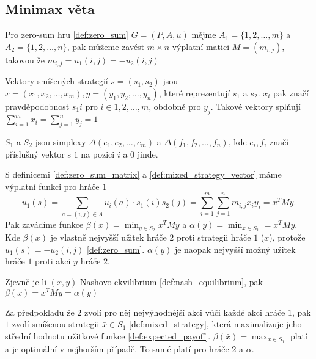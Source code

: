 \subsection{Minimax věta}
\begin{definition}
\label{def:zero_sum_matrix}
Pro zero-sum hru \ref{def:zero_sum} $G = (P, A, u)$ mějme $A_1 = \{1,2,\dots,m\}$ a $A_2 = \{1,2,\dots,n\}$, pak můžeme zavést $m \times n$ výplatní matici $M = (m_{i,j})$, takovou že $m_{i,j} = u_1(i,j) = -u_2(i,j)$
\end{definition}
\begin{definition}
\label{def:mixed_strategy_vector}
Vektory smíšených strategií $s =(s_1, s_2)$ jsou $x = (x_1, x_2, \dots, x_m), y = (y_1, y_2, \dots, y_n)$, které reprezentují $s_1$ a $s_2$. 
$x_i$ pak značí pravděpodobnost $s_1{i}$ pro $i \in {1,2,\dots,m}$, obdobně pro $y_j$. 
Takové vektory splňují $\sum_{i=1}^m  x_i = \sum_{j=1}^n  y_j = 1$

$S_1$ a $S_2$ jsou simplexy $\Delta(e_1, e_2, \dots, e_m)$ a $\Delta(f_1, f_2, \dots, f_n)$, kde $e_i, f_i$ značí příslušný vektor s $1$ na pozici $i$ a $0$ jinde.
\end{definition}
\begin{definition}
\label{def:beta_alpha}
S definicemi \ref{def:zero_sum_matrix} a \ref{def:mixed_strategy_vector} máme výplatní funkci pro hráče $1$
\[
    u_1(s) = \sum_{a = (i,j) \in A} u_i(a) \cdot s_1(i)s_2(j) = \sum^m_{i = 1} \sum^n_{j=1} m_{i,j} x_i y_i = x^T M y.
\]
Pak zavádíme funkce $\beta(x) = \min_{y \in S_2} x^T M y$ a $\alpha(y) = \min_{x\in S_1} = x^T M y$. 
Kde $\beta(x)$ je vlastně nejvyšší užitek hráče $2$ proti strategii hráče $1$ ($x$), protože $u_1(s) = -u_2(i,j)$ \ref{def:zero_sum}. 
$\alpha(y)$ je naopak nejvyšší možný užitek hráče $1$ proti akci $y$ hráče $2$. 

Zjevně je-li $(x,y)$ Nashovo ekvilibrium \ref{def:nash_equilibrium}, pak $\beta(x) = x^T M y = \alpha(y)$
\end{definition}

Za předpokladu že $2$ zvolí pro něj nejvýhodnější akci vůči každé akci hráče $1$, pak $1$ zvolí smíšenou strategii $\bar{x} \in S_1$ \ref{def:mixed_strategy}, která maximalizuje jeho střední hodnotu užitkové funkce \ref{def:expected_payoff}. $\beta(\bar{x}) = \max_{x\in S_1}$ platí a je optimální v nejhorším případě. To samé platí pro hráče $2$ a $\alpha$. 

